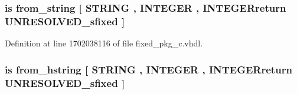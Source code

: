 \hypertarget{classfixed__pkg_a9152bf71997f3ccb3ea38a0acc3227ad}{}
\subsubsection[{from\+\_\+bstring}]{ {\bfseries \textcolor{keywordflow}{is}\textcolor{vhdlchar}{ }\textcolor{vhdlchar}{from\+\_\+string}\textcolor{vhdlchar}{ }\textcolor{vhdlchar}{\mbox{[}}\textcolor{vhdlchar}{ }\textcolor{comment}{S\+T\+R\+I\+N\+G}\textcolor{vhdlchar}{ }\textcolor{vhdlchar}{,}\textcolor{vhdlchar}{ }\textcolor{comment}{I\+N\+T\+E\+G\+E\+R}\textcolor{vhdlchar}{ }\textcolor{vhdlchar}{,}\textcolor{vhdlchar}{ }\textcolor{vhdlchar}{I\+N\+T\+E\+G\+E\+Rreturn}\textcolor{vhdlchar}{ }{\bfseries {\bf U\+N\+R\+E\+S\+O\+L\+V\+E\+D\+\_\+sfixed}} \textcolor{vhdlchar}{ }\textcolor{vhdlchar}{\mbox{]}}\textcolor{vhdlchar}{ }} \hspace{0.3cm}{\ttfamily [Alias]}}\label{classfixed__pkg_a9152bf71997f3ccb3ea38a0acc3227ad}


Definition at line 1702038116 of file fixed\+\_\+pkg\+\_\+c.\+vhdl.

\hypertarget{classfixed__pkg_a741c442bc1dbeb9419d264c76b8dbac2}{}
\subsubsection[{from\+\_\+hex\+\_\+string}]{ {\bfseries \textcolor{keywordflow}{is}\textcolor{vhdlchar}{ }\textcolor{vhdlchar}{from\+\_\+hstring}\textcolor{vhdlchar}{ }\textcolor{vhdlchar}{\mbox{[}}\textcolor{vhdlchar}{ }\textcolor{comment}{S\+T\+R\+I\+N\+G}\textcolor{vhdlchar}{ }\textcolor{vhdlchar}{,}\textcolor{vhdlchar}{ }\textcolor{comment}{I\+N\+T\+E\+G\+E\+R}\textcolor{vhdlchar}{ }\textcolor{vhdlchar}{,}\textcolor{vhdlchar}{ }\textcolor{vhdlchar}{I\+N\+T\+E\+G\+E\+Rreturn}\textcolor{vhdlchar}{ }{\bfseries {\bf U\+N\+R\+E\+S\+O\+L\+V\+E\+D\+\_\+sfixed}} \textcolor{vhdlchar}{ }\textcolor{vhdlchar}{\mbox{]}}\textcolor{vhdlchar}{ }} \hspace{0.3cm}{\ttfamily [Alias]}}\label{classfixed__pkg_a741c442bc1dbeb9419d264c76b8dbac2}


